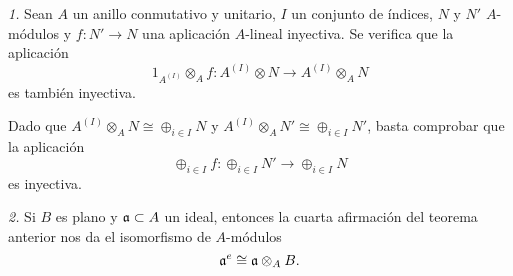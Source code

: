\documentclass[../main.tex]{subfiles}
\begin{document}
\begin{remark}\textit{1.} Sean $A$ un anillo conmutativo y unitario, $I$ un conjunto de índices, $N$ y $N'$ $A$-módulos y $f:N'\longrightarrow N$ una aplicación $A$-lineal inyectiva. Se verifica que la aplicación $$1_{A^{(I)}}\otimes_A f:A^{(I)}\otimes N\longrightarrow A^{(I)}\otimes_A N$$ es también inyectiva.

	Dado que $A^{(I)}\otimes_A N\cong\oplus_{i\in I}N$ y $A^{(I)}\otimes_A N'\cong\oplus_{i\in I}N'$, basta comprobar que la aplicación $$\oplus_{i\in I}f:\oplus_{i\in I}N'\longrightarrow \oplus_{i\in I}N$$ es inyectiva.

	\textit{2.} Si $B$ es plano y $\mathfrak{a}\subset A$ un ideal, entonces la cuarta afirmación del teorema anterior nos da el isomorfismo de $A$-módulos $$\mathfrak{a}^e\cong \mathfrak{a}\otimes_A B.$$
\end{remark}
\end{document}
